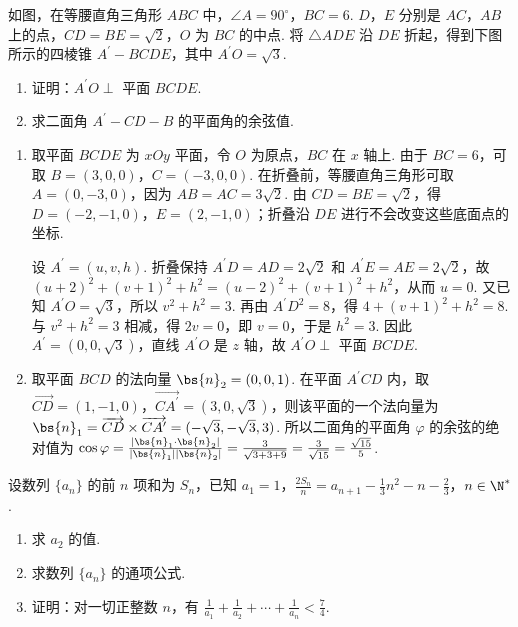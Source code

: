\begin{problem}
如图，在等腰直角三角形 \(ABC\) 中，\(\angle A = 90^{\circ}\)，\(BC = 6\).
\(D\)，\(E\) 分别是 \(AC\)，\(AB\) 上的点，\(CD = BE = \sqrt{2}\)，\(O\) 为 \(BC\) 的中点.
将 \(\triangle ADE\) 沿 \(DE\) 折起，得到下图所示的四棱锥 \(A^{\prime} - BCDE\)，其中 \(A^{\prime}O = \sqrt{3}\).

\begin{enumerate}
\item 证明：\(A^{\prime}O \perp\) 平面 \(BCDE\).
\item 求二面角 \(A^{\prime} - CD - B\) 的平面角的余弦值.
\end{enumerate}

\end{problem}

\begin{solution}
\begin{enumerate}
\item 取平面 \(BCDE\) 为 \(xOy\) 平面，令 \(O\) 为原点，\(BC\) 在 \(x\) 轴上. 由于 \(BC=6\)，可取 \(B=(3,0,0)\)，\(C=(-3,0,0)\). 在折叠前，等腰直角三角形可取 \(A=(0,-3,0)\)，因为 \(AB=AC=3\sqrt2\). 由 \(CD=BE=\sqrt2\)，得 \(D=(-2,-1,0)\)，\(E=(2,-1,0)\)；折叠沿 \(DE\) 进行不会改变这些底面点的坐标.

设 \(A^{\prime}=(u,v,h)\). 折叠保持 \(A^{\prime}D=AD=2\sqrt2\) 和 \(A^{\prime}E=AE=2\sqrt2\)，故
\((u+2)^2+(v+1)^2+h^2=(u-2)^2+(v+1)^2+h^2\)，从而 \(u=0\). 又已知 \(A^{\prime}O=\sqrt3\)，所以 \(v^2+h^2=3\). 再由 \(A^{\prime}D^2=8\)，得 \(4+(v+1)^2+h^2=8\). 与 \(v^2+h^2=3\) 相减，得 \(2v=0\)，即 \(v=0\)，于是 \(h^2=3\). 因此 \(A^{\prime}=(0,0,\sqrt3)\)，直线 \(A^{\prime}O\) 是 \(z\) 轴，故 \(A^{\prime}O\perp\) 平面 \(BCDE\).
\item 取平面 \(BCD\) 的法向量 \(\bs{n}_2=(0,0,1)\). 在平面 \(A^{\prime}CD\) 内，取
\(\overrightarrow{CD}=(1,-1,0)\)，\(\overrightarrow{CA^{\prime}}=(3,0,\sqrt3)\)，则该平面的一个法向量为
\(\bs{n}_1=\overrightarrow{CD}\times\overrightarrow{CA^{\prime}}=(-\sqrt3,-\sqrt3,3)\). 所以二面角的平面角 \(\varphi\) 的余弦的绝对值为
\(\cos\varphi=\frac{|\bs{n}_1\cdot\bs{n}_2|}{|\bs{n}_1||\bs{n}_2|}=\frac{3}{\sqrt{3+3+9}}=\frac{3}{\sqrt{15}}=\frac{\sqrt{15}}5\).
\end{enumerate}
\end{solution}

\begin{problem}
设数列 \(\{a_{n}\}\) 的前 \(n\) 项和为 \(S_{n}\)，已知 \(a_{1} = 1\)，\(\frac{2S_{n}}{n} = a_{n+1} - \frac{1}{3} n^{2} - n - \frac{2}{3}\)，\(n \in \N^{*}\).

\begin{enumerate}
\item 求 \(a_{2}\) 的值.
\item 求数列 \(\{a_{n}\}\) 的通项公式.
\item 证明：对一切正整数 \(n\)，有 \(\frac{1}{a_1} + \frac{1}{a_2} + \cdots + \frac{1}{a_n} < \frac{7}{4}\).
\end{enumerate}
\end{problem}

